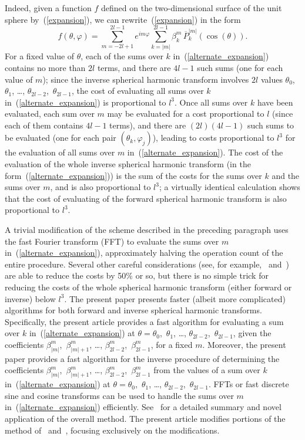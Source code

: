 \documentclass[final,3p,times]{elsarticle}
\def\phi{\varphi}
\begin{document}
Indeed, given a function $f$ defined on the two-dimensional surface
of the unit sphere by~(\ref{expansion}),
we can rewrite~(\ref{expansion}) in the form
\begin{equation}
\label{alternate_expansion}
f(\theta,\phi) = \sum_{m=-2l+1}^{2l-1} e^{i m \phi} \sum_{k=|m|}^{2l-1}
\beta^m_k \, \overline{P}^{|m|}_k(\cos(\theta)).
\end{equation}
For a fixed value of $\theta$, each of the sums over $k$
in~(\ref{alternate_expansion}) contains no more than $2l$ terms,
and there are $4l-1$ such sums (one for each value of $m$);
since the inverse spherical harmonic transform involves $2l$ values
$\theta_0$,~$\theta_1$, \dots, $\theta_{2l-2}$,~$\theta_{2l-1}$,
the cost of evaluating all sums over $k$ in~(\ref{alternate_expansion})
is proportional to $l^3$. Once all sums over $k$ have been evaluated,
each sum over $m$ may be evaluated for a cost proportional to $l$
(since each of them contains $4l-1$ terms),
and there are $(2l)(4l-1)$ such sums to be evaluated
(one for each pair $(\theta_k,\phi_j)$),
leading to costs proportional to $l^3$ for the evaluation of
all sums over $m$ in~(\ref{alternate_expansion}).
The cost of the evaluation of the whole inverse spherical harmonic transform
(in the form~(\ref{alternate_expansion})) is the sum
of the costs for the sums over $k$ and the sums over $m$,
and is also proportional to $l^3$;
a virtually identical calculation shows that the cost of evaluating
of the forward spherical harmonic transform is also proportional to $l^3$.

A trivial modification of the scheme described in the preceding paragraph
uses the fast Fourier transform (FFT) to evaluate the sums over $m$
in~(\ref{alternate_expansion}),
approximately halving the operation count of the entire procedure.
Several other careful considerations
(see, for example,~\cite{adams-swarztrauber} and~\cite{swarztrauber-spotz})
are able to reduce the costs by 50\% or so,
but there is no simple trick for reducing the costs
of the whole spherical harmonic transform (either forward or inverse)
below $l^3$. The present paper presents faster (albeit more complicated)
algorithms for both forward and inverse spherical harmonic transforms.
Specifically, the present article provides a fast algorithm
for evaluating a sum over $k$ in~(\ref{alternate_expansion})
at $\theta = \theta_0$,~$\theta_1$, \dots, $\theta_{2l-2}$,~$\theta_{2l-1}$,
given the coefficients $\beta^m_{|m|}$,~$\beta^m_{|m|+1}$, \dots,
$\beta^m_{2l-2}$,~$\beta^m_{2l-1}$, for a fixed $m$.
Moreover, the present paper provides a fast algorithm
for the inverse procedure of determining the coefficients
$\beta^m_{|m|}$,~$\beta^m_{|m|+1}$, \dots, $\beta^m_{2l-2}$,~$\beta^m_{2l-1}$
from the values of a sum over $k$ in~(\ref{alternate_expansion})
at $\theta = \theta_0$,~$\theta_1$, \dots, $\theta_{2l-2}$,~$\theta_{2l-1}$.
FFTs or fast discrete sine and cosine transforms can be used
to handle the sums over $m$ in~(\ref{alternate_expansion}) efficiently.
See~\cite{reuter-ratner-seideman} for a detailed summary and novel application
of the overall method. The present article modifies portions of the method
of~\cite{reuter-ratner-seideman} and~\cite{tygert_sph},
focusing exclusively on the modifications.
\end{document}

